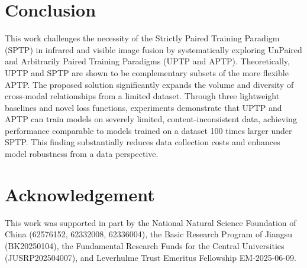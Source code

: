 \section{Conclusion}
This work challenges the necessity of the Strictly Paired Training Paradigm (SPTP) in infrared and visible image fusion by systematically exploring UnPaired and Arbitrarily Paired Training Paradigms (UPTP and APTP). Theoretically, UPTP and SPTP are shown to be complementary subsets of the more flexible APTP. The proposed solution significantly expands the volume and diversity of cross-modal relationships from a limited dataset. Through three lightweight baselines and novel loss functions, experiments demonstrate that UPTP and APTP can train models on severely limited, content-inconsistent data, achieving performance comparable to models trained on a dataset 100 times larger under SPTP. This finding substantially reduces data collection costs and enhances model robustness from a data perspective. 

\section{Acknowledgement}
This work was supported in part by the National Natural Science Foundation of China (62576152, 62332008, 62336004), the Basic Research Program of Jiangsu (BK20250104), the Fundamental Research Funds for the Central Universities (JUSRP202504007), and Leverhulme Trust Emeritus Fellowship EM-2025-06-09.